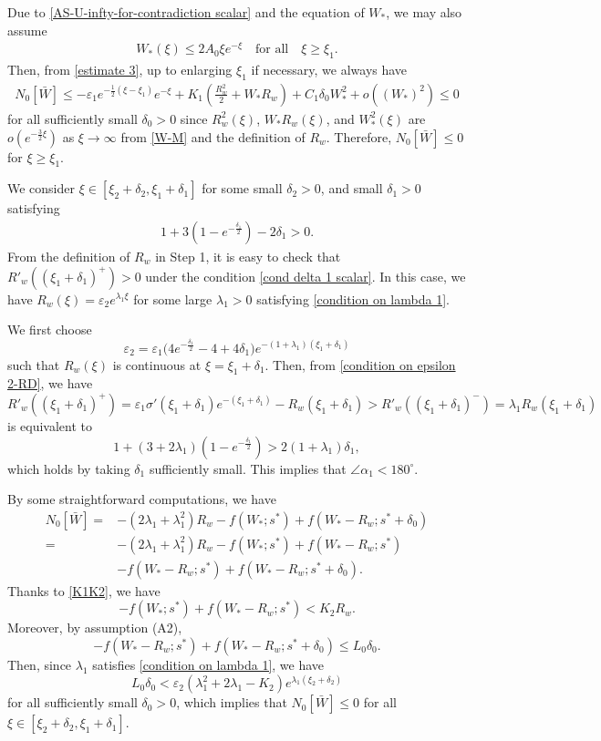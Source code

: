 \documentclass[11pt,a4paper]{article}
\numberwithin{equation}{section}
\numberwithin{figure}{section}
\newcommand\bea{\begin{eqnarray}}
\newcommand\eea{\end{eqnarray}}
\newcommand\beaa{\begin{eqnarray*}}
\newcommand\eeaa{\end{eqnarray*}}
\begin{document}
Due to \eqref{AS-U-infty-for-contradiction scalar} and the equation of $W_*$, we may also assume
\bea\label{W-M}
W_*(\xi) \leq 2A_0\xi e^{-\xi}\quad \mbox{for all}\quad\xi\geq \xi_1.
\eea
Then, from \eqref{estimate 3}, up to enlarging $\xi_1$ if necessary, we always have %
\beaa
N_0[\bar W]\le -\varepsilon_1e^{-\frac{1}{2}(\xi-\xi_1)}e^{-\xi}+K_1(\frac{R_w^2}{2}+W_*R_w)+C_1\delta_0W_*^2+o((W_*)^2)\le 0
\eeaa
for all sufficiently small $\delta_0>0$
since $R_w^2(\xi)$, $W_*R_w(\xi)$, and  $W_*^2(\xi)$ are $o(e^{-\frac{3}{2}\xi})$
as $\xi\to\infty$
from \eqref{W-M} and the definition of $R_w$.
Therefore, $N_0[\bar W]\leq 0$ for $\xi\ge \xi_1$.


\medskip


 We consider $\xi\in[\xi_2+\delta_2,\xi_1+\delta_1]$ for some small $\delta_2>0$, and small $\delta_1>0$ satisfying
\bea\label{cond delta 1 scalar}
1+3(1-e^{-\frac{\delta_1}{2}})-2\delta_1>0.
\eea
From the definition of $R_w$ in Step 1, it is easy to check that $R'_w((\xi_1+\delta_1)^+)>0$ under the condition \eqref{cond delta 1 scalar}.
In this case, we have $R_w(\xi)=\varepsilon_2 e^{\lambda_1\xi}$
for some large $\lambda_1>0$ satisfying \eqref{condition on lambda 1}.

We first choose
\begin{equation}\label{condition on epsilon 2-RD}
\varepsilon_2=\varepsilon_1\Big(4e^{-\frac{\delta_1}{2}}-4+4\delta_1\Big)e^{-(1+\lambda_1)(\xi_1+\delta_1)}
\end{equation}
such that $R_w(\xi)$ is continuous at $\xi=\xi_{1}+\delta_1$. Then, from \eqref{condition on epsilon 2-RD}, we have
$$R'_w((\xi_1+\delta_1)^{+})=\varepsilon_1\sigma'(\xi_1+\delta_1)e^{-(\xi_1+\delta_1)}- R_w(\xi_1+\delta_1)>R'_w((\xi_1+\delta_1)^{-})=\lambda_1R_w(\xi_1+\delta_1)$$
is equivalent to
$$1+(3+2\lambda_1)(1-e^{-\frac{\delta_1}{2}})>2(1+\lambda_1)\delta_1,$$
which holds by taking $\delta_1$ sufficiently small.
This implies that $\angle\alpha_1<180^{\circ}$.

By some  straightforward computations, we have
\begin{equation*}
\begin{aligned}
N_0[\bar W]=&-(2\lambda_1+\lambda_1^2)R_w-f(W_*;s^*)+f(W_*-R_w;s^*+\delta_0)\\
=&-(2\lambda_1+\lambda_1^2)R_w-f(W_*;s^*)+f(W_*-R_w;s^*)\\
&-f(W_*-R_w;s^*)+f(W_*-R_w;s^*+\delta_0).
\end{aligned}
\end{equation*}
Thanks to \eqref{K1K2}, we have
$$-f(W_*;s^*)+f(W_*-R_w;s^*)< K_2R_w.$$
Moreover, by assumption (A2), %
$$-f(W_*-R_w;s^*)+f(W_*-R_w;s^*+\delta_0)\le L_0\delta_0.$$
Then, %
since
$\lambda_1$ satisfies \eqref{condition on lambda 1}, we have
$$L_0\delta_0<\varepsilon_2(\lambda_1^2+2\lambda_1-K_2) e^{\lambda_1(\xi_2+\delta_2)}$$
for all sufficiently small $\delta_0>0$,
which implies that $N_0[\bar W]\le 0$ for all $\xi\in[\xi_2+\delta_2,\xi_1+\delta_1]$.
\end{document}
